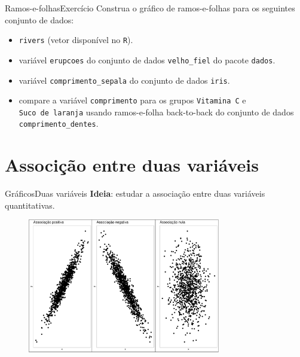 \documentclass[
  10pt,
  ignorenonframetext,
]{beamer}
\providecommand{\tightlist}{%
  \setlength{\itemsep}{0pt}\setlength{\parskip}{0pt}}\usepackage{longtable,booktabs,array}
\begin{document}
\begin{frame}[fragile]{Ramos-e-folhas\newline Exercício}
\protect\hypertarget{ramos-e-folhasexercuxedcio}{}
Construa o gráfico de ramos-e-folhas para os seguintes conjunto de
dados:

\begin{itemize}
\tightlist
\item
  \texttt{rivers} (vetor disponível no \texttt{R}).
\item
  variável \texttt{erupcoes} do conjunto de dados \texttt{velho\_fiel}
  do pacote \texttt{dados}.
\item
  variável \texttt{comprimento\_sepala} do conjunto de dados
  \texttt{iris}.
\item
  compare a variável \texttt{comprimento} para os grupos
  \texttt{Vitamina\ C} e \texttt{Suco\ de\ laranja} usando ramos-e-folha
  back-to-back do conjunto de dados \texttt{comprimento\_dentes}.
\end{itemize}
\end{frame}

\hypertarget{associuxe7uxe3o-entre-duas-variuxe1veis}{%
\section{Associção entre duas
variáveis}\label{associuxe7uxe3o-entre-duas-variuxe1veis}}

\begin{frame}{Gráficos\newline Duas variáveis}
\protect\hypertarget{gruxe1ficosduas-variuxe1veis}{}
\textbf{Ideia}: estudar a associação entre duas variáveis quantitativas.

\begin{figure}

{\centering \includegraphics[width=0.75\textwidth,height=\textheight]{exploracao-visualizacao_files/figure-beamer/unnamed-chunk-119-1.pdf}

}

\end{figure}
\end{frame}
\end{document}
